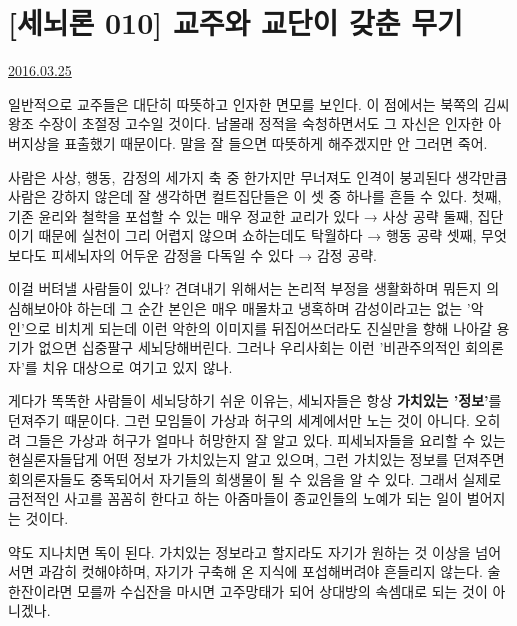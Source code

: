 \section{[세뇌론 010] 교주와 교단이 갖춘 무기}
\href{https://www.kockoc.com/Apoc/694250}{2016.03.25}

\vspace{5mm}

일반적으로 교주들은 대단히 따뜻하고 인자한 면모를 보인다.
이 점에서는 북쪽의 김씨 왕조 수장이 초절정 고수일 것이다. 남몰래 정적을 숙청하면서도
그 자신은 인자한 아버지상을 표출했기 때문이다. 말을 잘 들으면 따뜻하게 해주겠지만 안 그러면 죽어.
\vspace{5mm}

사람은 사상, 행동, 감정의 세가지 축 중 한가지만 무너져도 인격이 붕괴된다
생각만큼 사람은 강하지 않은데 잘 생각하면 컬트집단들은 이 셋 중 하나를 흔들 수 있다.
첫째, 기존 윤리와 철학을 포섭할 수 있는 매우 정교한 교리가 있다 → 사상 공략
둘째, 집단이기 때문에 실천이 그리 어렵지 않으며 쇼하는데도 탁월하다 → 행동 공략
셋째, 무엇보다도 피세뇌자의 어두운 감정을 다독일 수 있다 → 감정 공략.
\vspace{5mm}

이걸 버텨낼 사람들이 있나?
견뎌내기 위해서는 논리적 부정을 생활화하며 뭐든지 의심해보아야 하는데
그 순간 본인은 매우 매몰차고 냉혹하며 감성이라고는 없는 '악인'으로 비치게 되는데
이런 악한의 이미지를 뒤집어쓰더라도 진실만을 향해 나아갈 용기가 없으면 십중팔구 세뇌당해버린다.
그러나 우리사회는 이런 '비관주의적인 회의론자'를 치유 대상으로 여기고 있지 않나.
\vspace{5mm}

게다가 똑똑한 사람들이 세뇌당하기 쉬운 이유는, 세뇌자들은 항상 \textbf{가치있는 '정보'}를 던져주기 때문이다.
그런 모임들이 가상과 허구의 세계에서만 노는 것이 아니다. 오히려 그들은 가상과 허구가 얼마나 허망한지 잘 알고 있다.
피세뇌자들을 요리할 수 있는 현실론자들답게 어떤 정보가 가치있는지 알고 있으며,
그런 가치있는 정보를 던져주면 회의론자들도 중독되어서 자기들의 희생물이 될 수 있음을 알 수 있다.
그래서 실제로 금전적인 사고를 꼼꼼히 한다고 하는 아줌마들이 종교인들의 노예가 되는 일이 벌어지는 것이다.
\vspace{5mm}

약도 지나치면 독이 된다. 가치있는 정보라고 할지라도 자기가 원하는 것 이상을 넘어서면 과감히 컷해야하며,
자기가 구축해 온 지식에 포섭해버려야 흔들리지 않는다.
술 한잔이라면 모를까 수십잔을 마시면 고주망태가 되어 상대방의 속셈대로 되는 것이 아니겠나.
\vspace{5mm}

